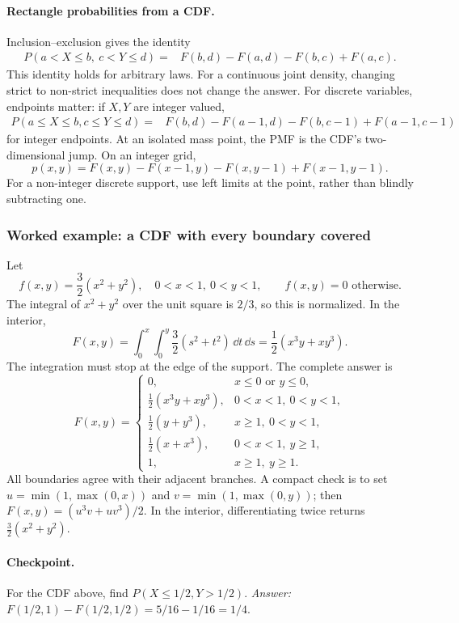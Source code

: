 \paragraph{Rectangle probabilities from a CDF.} Inclusion--exclusion gives the identity
\[
\boxed{\begin{aligned}
P(a<X\leq b,\ c<Y\leq d)
={}&F(b,d)-F(a,d)-F(b,c)+F(a,c).
\end{aligned}}
\]
This identity holds for arbitrary laws. For a continuous joint density, changing strict to non-strict inequalities does not change the answer. For discrete variables, endpoints matter: if $X,Y$ are integer valued,
\[
\begin{aligned}
P(a\leq X\leq b,c\leq Y\leq d)
={}&F(b,d)-F(a-1,d)-F(b,c-1)+F(a-1,c-1)
\end{aligned}
\]
for integer endpoints. At an isolated mass point, the PMF is the CDF's two-dimensional jump. On an integer grid,
\[
 p(x,y)=F(x,y)-F(x-1,y)-F(x,y-1)+F(x-1,y-1).
\]
For a non-integer discrete support, use left limits at the point, rather than blindly subtracting one.

\subsubsection*{Worked example: a CDF with every boundary covered}
Let
\[
 f(x,y)=\frac32(x^2+y^2),\quad 0<x<1,\ 0<y<1,
 \qquad f(x,y)=0\text{ otherwise}.
\]
The integral of $x^2+y^2$ over the unit square is $2/3$, so this is normalized. In the interior,
\[
 F(x,y)=\int_0^x\int_0^y\frac32(s^2+t^2)\,\dd t\,\dd s
 =\frac12(x^3y+xy^3).
\]
The integration must stop at the edge of the support. The complete answer is
\[
F(x,y)=
\begin{cases}
0,&x\leq0\text{ or }y\leq0,\\
\tfrac12(x^3y+xy^3),&0<x<1,\ 0<y<1,\\
\tfrac12(y+y^3),&x\geq1,\ 0<y<1,\\
\tfrac12(x+x^3),&0<x<1,\ y\geq1,\\
1,&x\geq1,\ y\geq1.
\end{cases}
\]
All boundaries agree with their adjacent branches. A compact check is to set $u=\min(1,\max(0,x))$ and $v=\min(1,\max(0,y))$; then $F(x,y)=(u^3v+uv^3)/2$. In the interior, differentiating twice returns $\tfrac32(x^2+y^2)$.

\paragraph{Checkpoint.} For the CDF above, find $P(X\leq1/2,Y>1/2)$. \emph{Answer:} $F(1/2,1)-F(1/2,1/2)=5/16-1/16=1/4$.

